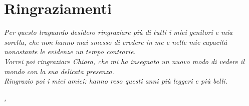 
\cleardoublepage
{}
{}



\bigskip

\begingroup
\let\clearpage\relax
\let\cleardoublepage\relax
\let\cleardoublepage\relax

\chapter*{Ringraziamenti}

\noindent \textit{Per questo traguardo desidero ringraziare più di tutti i miei genitori e mia sorella, che non hanno mai smesso di credere in me e nelle mie capacità nonostante le evidenze un tempo contrarie.}\\

\noindent \textit{Vorrei poi ringraziare Chiara, che mi ha insegnato un nuovo modo di vedere il mondo con la sua delicata presenza.}\\

\noindent \textit{Ringrazio poi i miei amici: hanno reso questi anni più leggeri e più belli.}\\

\bigskip

\noindent\textit{\myLocation, \myTime}
\hfill \myName

\endgroup

